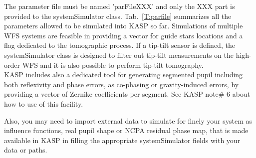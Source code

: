 \documentclass[12pt]{article}
\begin{document}
The parameter file must be named 'parFileXXX' and only the XXX part is provided to the systemSimulator class. Tab.~\ref{T:parfile} summarizes all the parameters allowed to be simulated into KASP so far. Simulations of multiple WFS systems are feasible in providing a vector for guide stars locations and a flag dedicated to the tomographic process. If a tip-tilt sensor is defined, the systemSimulator class is designed to filter out tip-tilt measurements on the high-order WFS and it is also possible to perform tip-tilt tomography.\\

KASP includes also a dedicated tool for generating segmented pupil including both reflexivity and phase errors, as co-phasing or gravity-induced errors, by providing a vector of Zernike coefficients per segment. See KASP note\# 6 about how to use of this facility.

Also, you may need to import external data to simulate for finely your system as influence functions, real pupil shape or NCPA residual phase map, that is made available in KASP in filling the appropriate systemSimulator fields with your data or paths.
\end{document}
